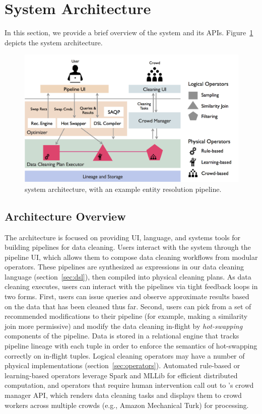 \section{System Architecture}

In this section, we provide a brief overview of the \sys system and its APIs.
Figure~\ref{fig:arch} depicts the system architecture.

\begin{figure}[t]
\centering
\includegraphics[width = .5\textwidth]{figs/architecture.png}
\caption{\sys system architecture, with an example entity resolution pipeline.}
\label{fig:arch}
\end{figure}

\subsection{Architecture Overview}
The \sys architecture is focused on providing UI, language, and systems tools for building pipelines for data cleaning. 
Users interact with the system through the pipeline UI, which allows them to compose data cleaning workflows from modular operators.
These pipelines are synthesized as expressions in our data cleaning language (section~\ref{sec:dsl}), then compiled into physical cleaning plans.
As data cleaning executes, users can interact with the pipelines via tight feedback loops in two forms.
First, users can issue queries and observe approximate results based on the data that has been cleaned thus far.
Second, users can pick from a set of recommended modifications to their pipeline (for example, making a similarity join more permissive) and modify the data cleaning in-flight by \textit{hot-swapping} components of the pipeline.
Data is stored in a relational engine that tracks pipeline lineage with each tuple in order to enforce the semantics of hot-swapping correctly on in-flight tuples.
Logical cleaning operators may have a number of physical implementations (section~\ref{sec:operators}).
Automated rule-based or learning-based operators leverage Spark and MLLib for efficient distributed computation, and operators that require human intervention call out to \sys's crowd manager API, which renders data cleaning tasks and displays them to crowd workers across multiple crowds (e.g., Amazon Mechanical Turk) for processing.

